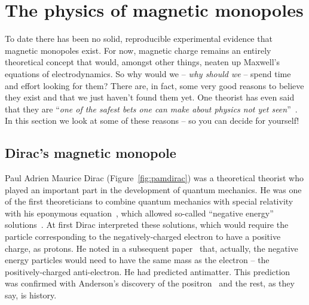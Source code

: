 \section{The physics of magnetic monopoles}
\label{sec:theory}
To date there has been no solid, reproducible experimental evidence that
magnetic monopoles exist. For now, magnetic charge remains an entirely
theoretical concept that would, amongst other things, neaten up Maxwell's
equations of electrodynamics.
%
So why would we -- \emph{why should we} -- spend time and effort looking
for them? There are, in fact, some very good reasons to believe they exist
and that we just haven't found them yet.
%
One theorist has even said that they are ``\emph{one of the safest
bets one can make about physics not yet seen}''~\cite{Polchinski2004}.
%
In this section we look at some of these reasons -- so you
can decide for yourself!

\subsection{Dirac's magnetic monopole}
\label{sec:diracmonopole}
Paul Adrien Maurice Dirac (Figure~\ref{fig:pamdirac}) was a theoretical
theorist who played an important part in the development of quantum mechanics.
He was one of the first theoreticians to combine quantum mechanics with
special relativity with his eponymous equation~\cite{Dirac1928},
which allowed so-called ``negative energy'' solutions~\cite{Dirac1930}.
%
At first Dirac interpreted these solutions,
which would require the particle corresponding to the negatively-charged
electron to have a positive charge, as protons.
%
He noted in a subsequent paper~\cite{Dirac1931} that, actually,
the negative energy particles would need to have the same mass as the
electron -- the positively-charged anti-electron.
%
He had predicted antimatter.
%
This prediction was confirmed with Anderson's discovery of the
positron~\cite{Anderson1933} and the rest, as they say, is history.

